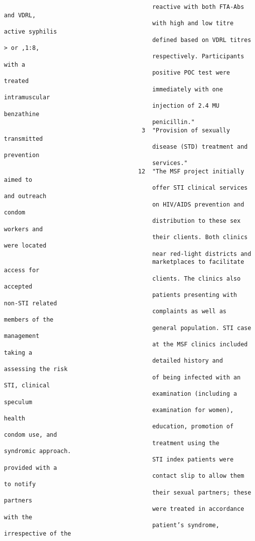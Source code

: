 \documentclass{article}
\begin{document}
\begin{verbatim}
                                          reactive with both FTA-Abs and VDRL,
                                          with high and low titre active syphilis
                                          defined based on VDRL titres > or ,1:8,
                                          respectively. Participants with a
                                          positive POC test were treated
                                          immediately with one intramuscular
                                          injection of 2.4 MU benzathine
                                          penicillin."
                                       3  "Provision of sexually transmitted
                                          disease (STD) treatment and prevention
                                          services."
                                      12  "The MSF project initially aimed to
                                          offer STI clinical services and outreach
                                          on HIV/AIDS prevention and condom
                                          distribution to these sex workers and
                                          their clients. Both clinics were located
                                          near red-light districts and
                                          marketplaces to facilitate access for
                                          clients. The clinics also accepted
                                          patients presenting with non-STI related
                                          complaints as well as members of the
                                          general population. STI case management
                                          at the MSF clinics included taking a
                                          detailed history and assessing the risk
                                          of being infected with an STI, clinical
                                          examination (including a speculum
                                          examination for women), health
                                          education, promotion of condom use, and
                                          treatment using the syndromic approach.
                                          STI index patients were provided with a
                                          contact slip to allow them to notify
                                          their sexual partners; these partners
                                          were treated in accordance with the
                                          patient’s syndrome, irrespective of the

\end{verbatim}
\end{document}
